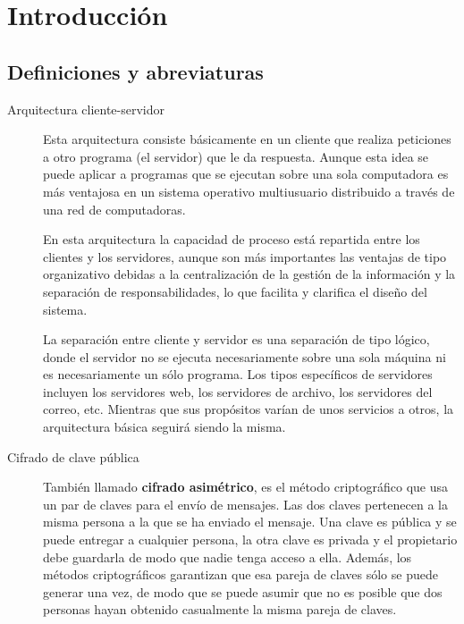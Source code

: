 \chapter{Introducción}\label{introduccion}
\section{Definiciones y abreviaturas}\label{definicionesyabreviaturas}

\begin{description}


\item[Arquitectura cliente-servidor]
Esta arquitectura consiste básicamente en un cliente que realiza peticiones a otro programa (el servidor) que le da respuesta. Aunque esta idea se puede aplicar a programas que se ejecutan sobre una sola computadora es más ventajosa en un sistema operativo multiusuario distribuido a través de una red de computadoras.

En esta arquitectura la capacidad de proceso está repartida entre los clientes y los servidores, aunque son más importantes las ventajas de tipo organizativo debidas a la centralización de la gestión de la información y la separación de responsabilidades, lo que facilita y clarifica el diseño del sistema.

La separación entre cliente y servidor es una separación de tipo lógico, donde el servidor no se ejecuta necesariamente sobre una sola máquina ni es necesariamente un sólo programa. Los tipos específicos de servidores incluyen los servidores web, los servidores de archivo, los servidores del correo, etc. Mientras que sus propósitos varían de unos servicios a otros, la arquitectura básica seguirá siendo la misma.

\item[Cifrado de clave pública]
También llamado \textbf{cifrado asimétrico}, es el método criptográfico que usa un par de claves para el envío de mensajes. Las dos claves pertenecen a la misma persona a la que se ha enviado el mensaje. Una clave es pública y se puede entregar a cualquier persona, la otra clave es privada y el propietario debe guardarla de modo que nadie tenga acceso a ella. Además, los métodos criptográficos garantizan que esa pareja de claves sólo se puede generar una vez, de modo que se puede asumir que no es posible que dos personas hayan obtenido casualmente la misma pareja de claves.


\end{description}
